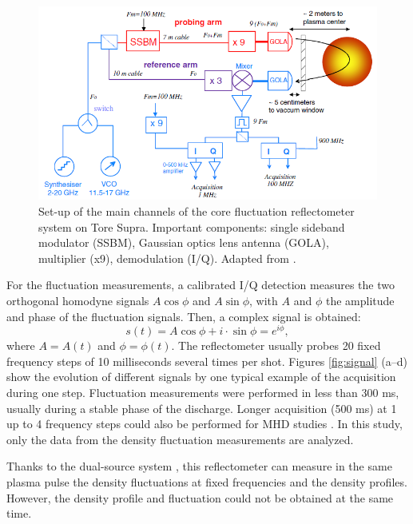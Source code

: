 \begin{figure}[h]
\begin{centering}
\includegraphics[scale=0.7]{drefluc.png}
\par\end{centering}
\caption{Set-up of the main channels of the core fluctuation reflectometer system on Tore Supra. Important components: single sideband modulator (SSBM), Gaussian optics lens antenna (GOLA), multiplier (x9), demodulation (I/Q). Adapted from \cite{Sabot_2006_NF}.}\label{fig:drefluc}
\end{figure}


For the fluctuation measurements, a calibrated I/Q detection measures the two orthogonal homodyne signals $A\cos\phi$ and $A\sin\phi$, with $A$ and $\phi$ the amplitude and phase of the fluctuation signals. Then, a complex signal is obtained: %
\begin{equation}
s(t)=A\cos\phi+ i \cdot \sin\phi = e^{i\phi},
\end{equation}
\noindent where $A=A(t)$ and $\phi=\phi(t)$. The reflectometer usually probes 20 fixed frequency steps of 10 milliseconds several times per shot. Figures \ref{fig:signal} (a--d) show the evolution of different signals by one typical example of the acquisition during one step. Fluctuation measurements were performed in less than 300 ms, usually during a stable phase of the discharge. Longer acquisition (500 ms) at 1 up to 4 frequency steps could also be performed for MHD studies \cite{Amador_2018_NF}. In this study, only the data from the density fluctuation measurements are analyzed.


Thanks to the dual-source system \cite{Sabot_2006_NF}, this reflectometer can measure in the same plasma pulse the density fluctuations at fixed frequencies and the density profiles. However, the density profile and fluctuation could not be obtained at the same time.


